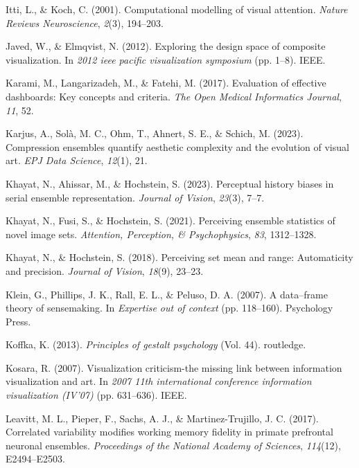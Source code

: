 \documentclass[print]{nuthesis}
\newlength{\cslhangindent}
\newenvironment{CSLReferences}[2]%
{\setlength{\parindent}{0pt}%
\everypar{\setlength{\hangindent}{\cslhangindent}}\ignorespaces}%
{\par}
\begin{document}
\begin{CSLReferences}{1}{0}
\leavevmode{}%
Itti, L., \& Koch, C. (2001). Computational modelling of visual attention. \emph{Nature Reviews Neuroscience}, \emph{2}(3), 194--203.

\leavevmode{}%
Javed, W., \& Elmqvist, N. (2012). Exploring the design space of composite visualization. In \emph{2012 ieee pacific visualization symposium} (pp. 1--8). IEEE.

\leavevmode{}%
Karami, M., Langarizadeh, M., \& Fatehi, M. (2017). Evaluation of effective dashboards: Key concepts and criteria. \emph{The Open Medical Informatics Journal}, \emph{11}, 52.

\leavevmode{}%
Karjus, A., Solà, M. C., Ohm, T., Ahnert, S. E., \& Schich, M. (2023). Compression ensembles quantify aesthetic complexity and the evolution of visual art. \emph{EPJ Data Science}, \emph{12}(1), 21.

\leavevmode{}%
Khayat, N., Ahissar, M., \& Hochstein, S. (2023). Perceptual history biases in serial ensemble representation. \emph{Journal of Vision}, \emph{23}(3), 7--7.

\leavevmode{}%
Khayat, N., Fusi, S., \& Hochstein, S. (2021). Perceiving ensemble statistics of novel image sets. \emph{Attention, Perception, \& Psychophysics}, \emph{83}, 1312--1328.

\leavevmode{}%
Khayat, N., \& Hochstein, S. (2018). Perceiving set mean and range: Automaticity and precision. \emph{Journal of Vision}, \emph{18}(9), 23--23.

\leavevmode{}%
Klein, G., Phillips, J. K., Rall, E. L., \& Peluso, D. A. (2007). A data--frame theory of sensemaking. In \emph{Expertise out of context} (pp. 118--160). Psychology Press.

\leavevmode{}%
Koffka, K. (2013). \emph{Principles of gestalt psychology} (Vol. 44). routledge.

\leavevmode{}%
Kosara, R. (2007). Visualization criticism-the missing link between information visualization and art. In \emph{2007 11th international conference information visualization (IV'07)} (pp. 631--636). IEEE.

\leavevmode{}%
Leavitt, M. L., Pieper, F., Sachs, A. J., \& Martinez-Trujillo, J. C. (2017). Correlated variability modifies working memory fidelity in primate prefrontal neuronal ensembles. \emph{Proceedings of the National Academy of Sciences}, \emph{114}(12), E2494--E2503.


\end{CSLReferences}
\end{document}
